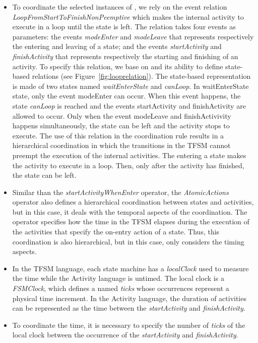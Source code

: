 \begin{itemize}
	\item To coordinate the selected instances of \dse, we rely on the event relation \emph{LoopFromStartToFinishNonPeemptive} which makes the internal activity to execute in a loop until the state is left. The relation takes four events as parameters: the events \emph{modeEnter} and \emph{modeLeave} that represents respectively the entering and leaving of a state; and the events \emph{startActivity} and \emph{finishActivity} that represents respectively the starting and finishing of an activity. To specify this relation, we base on \moccml and its ability to define state-based relations (see Figure~\ref{fig:looprelation}). The state-based representation is made of two states named \emph{waitEnterState} and \emph{canLoop}. In waitEnterState state, only the event modeEnter can occur. When this event happens, the state \emph{canLoop} is reached and the events startActivity and finishActivity are allowed to occur. Only when the event modeLeave and finishActivivity happens simultaneously, the state can be left and the activity stops to execute. The use of this relation in the coordination rule results in a hierarchical coordination in which the transitions in the TFSM cannot preempt the execution of the internal activities. The entering a state makes the activity to execute in a loop. Then, only after the activity has finished, the state can be left.
	
	\item Similar than the \emph{startActivityWhenEnter} operator, the \emph{AtomicActions} operator also defines a hierarchical coordination between states and activities, but in this case, it deals with the temporal aspects of the coordination. The operator specifies how the time in the TFSM elapses during the execution of the activities that specify the on-entry action of a state. Thus, this coordination is also hierarchical, but in this case, only considers the timing aspects.

	
	
	\item In the TFSM language, each state machine has a \emph{localClock} used to measure the time while the Activity language is untimed. The local clock is a \emph{FSMClock}, which defines a \dse named \emph{ticks} whose occurrences represent a physical time increment. In the Activity language, the duration of activities can be represented as the time between the \dse \emph{startActivity} and \dse \emph{finishActivity}. 
	\item To coordinate the time, it is necessary to specify the number of \emph{ticks} of the local clock between the occurrence of the \dse \emph{startActivity} and \emph{finishActivity}.
	

\end{itemize}
